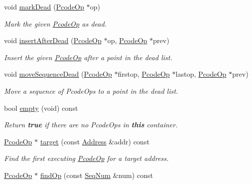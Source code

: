 \begin{DoxyCompactItemize}
void \mbox{\hyperlink{class_pcode_op_bank_ad4e924e79e478b3f867a4da3ba6d6c56}{mark\+Dead}} (\mbox{\hyperlink{class_pcode_op}{Pcode\+Op}} $\ast$op)
\begin{DoxyCompactList}\small\item\em Mark the given \mbox{\hyperlink{class_pcode_op}{Pcode\+Op}} as {\itshape dead}. \end{DoxyCompactList}\item 
void \mbox{\hyperlink{class_pcode_op_bank_aa1387fcf35d7e84e888f07c4cb167d65}{insert\+After\+Dead}} (\mbox{\hyperlink{class_pcode_op}{Pcode\+Op}} $\ast$op, \mbox{\hyperlink{class_pcode_op}{Pcode\+Op}} $\ast$prev)
\begin{DoxyCompactList}\small\item\em Insert the given \mbox{\hyperlink{class_pcode_op}{Pcode\+Op}} after a point in the {\itshape dead} list. \end{DoxyCompactList}\item 
void \mbox{\hyperlink{class_pcode_op_bank_a64514bb8cab2719f46a03dfe9c7b7a59}{move\+Sequence\+Dead}} (\mbox{\hyperlink{class_pcode_op}{Pcode\+Op}} $\ast$firstop, \mbox{\hyperlink{class_pcode_op}{Pcode\+Op}} $\ast$lastop, \mbox{\hyperlink{class_pcode_op}{Pcode\+Op}} $\ast$prev)
\begin{DoxyCompactList}\small\item\em Move a sequence of Pcode\+Ops to a point in the {\itshape dead} list. \end{DoxyCompactList}\item 
bool \mbox{\hyperlink{class_pcode_op_bank_aefe81f2a41de865f29c46270e8375236}{empty}} (void) const
\begin{DoxyCompactList}\small\item\em Return {\bfseries{true}} if there are no Pcode\+Ops in {\bfseries{this}} container. \end{DoxyCompactList}\item 
\mbox{\hyperlink{class_pcode_op}{Pcode\+Op}} $\ast$ \mbox{\hyperlink{class_pcode_op_bank_a12b06dc13326ce0291125b9dd11fadee}{target}} (const \mbox{\hyperlink{class_address}{Address}} \&addr) const
\begin{DoxyCompactList}\small\item\em Find the first executing \mbox{\hyperlink{class_pcode_op}{Pcode\+Op}} for a target address. \end{DoxyCompactList}\item 
\mbox{\hyperlink{class_pcode_op}{Pcode\+Op}} $\ast$ \mbox{\hyperlink{class_pcode_op_bank_a6c9ca53e38a2c3c81dbfde410e33fd02}{find\+Op}} (const \mbox{\hyperlink{class_seq_num}{Seq\+Num}} \&num) const

\end{DoxyCompactItemize}
